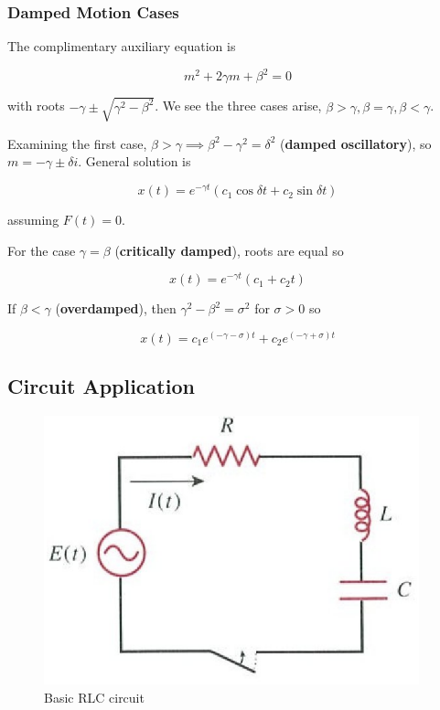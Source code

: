 \subsubsection{Damped Motion Cases}

The complimentary auxiliary equation is

\begin{equation}
    m^2+2\gamma m+\beta^2=0
\end{equation}

with roots $-\gamma \pm \sqrt{\gamma^2-\beta^2}$. We see the three cases arise,
$\beta > \gamma , \beta=\gamma,\beta <\gamma$.

Examining the first case, $\beta>\gamma\implies \beta^2-\gamma^2=\delta^2$ (\textbf{damped oscillatory}), so
$m=-\gamma \pm \delta i$. General solution is

\begin{equation}
    x(t)=e^{-\gamma t}(c_1\cos\delta t+c_2\sin\delta t)
\end{equation}

assuming $F(t)=0$.

For the case $\gamma = \beta$ (\textbf{critically damped}), roots are equal so

\begin{equation}
    x(t)=e^{-\gamma t}(c_1+c_2t)
\end{equation}

If $\beta<\gamma$ (\textbf{overdamped}), then $\gamma^2-\beta^2=\sigma^2$ for $\sigma>0$ so

\begin{equation}
    x(t)=c_1e^{(-\gamma-\sigma)t}+c_2e^{(-\gamma+\sigma)t}
\end{equation}

\subsection{Circuit Application}

\begin{figure}[H]
    \centering
    \includegraphics[]{figures/RLC.png}
    \caption{Basic RLC circuit}
\end{figure}

